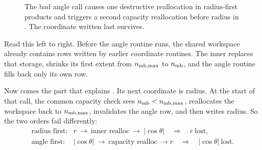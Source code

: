 \documentclass[11pt]{article}
\begin{document}
\begin{figure}[ht]
\centering
{}
\caption{The bad angle call causes one destructive reallocation in
radius-first products and triggers a second capacity reallocation before
radius in . The coordinate written last survives.
\schematicnote}
\end{figure}

Read this left to right. Before the angle routine runs, the shared workspace
already contains rows written by earlier coordinate routines. The inner
 replaces that storage, shrinks its first extent from
\(n_{\rm mb,max}\) to \(n_{\rm mb}\), and the angle routine fills back only its
own row.

Now comes the part that explains . Its next coordinate is
radius. At the start of that call, the common capacity check sees
\(n_{\rm mb}<n_{\rm mb,max}\), reallocates the workspace back to
\(n_{\rm mb,max}\), invalidates the angle row, and then writes radius. So the
two orders fail differently:
\[
\begin{array}{ll}
\text{radius first:} & r\ \longrightarrow\ \text{inner realloc}\ \longrightarrow\
|\cos\theta| \quad \Rightarrow\quad r\ \text{lost},\\
\text{angle first:} & |\cos\theta|\ \longrightarrow\ \text{capacity realloc}\
\longrightarrow r \quad \Rightarrow\quad |\cos\theta|\ \text{lost}.
\end{array}
\]
\end{document}
